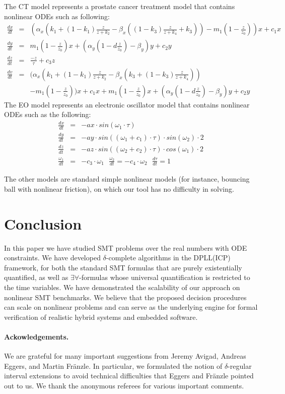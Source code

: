 \documentclass[11pt]{article}
\begin{document}
The CT model represents a prostate cancer treatment model that contains nonlinear ODEs such as following:
\begin{eqnarray*}
\frac{dx}{dt} &=& (\alpha_x
(k_1+(1-k_1)\frac{z}{z+k_2}-\beta_x( (1-k_3)\frac{z}{z+k_4}+k_3)) - m_1(1-\frac{z}{z_0}))x + c_1 x\\
\frac{dy}{dt} &=& m_1(1-\frac{z}{z_0})x+(\alpha_y (1- d\frac{z}{z_0}) - \beta_y)y+c_2y\\
\frac{dz}{dt} &=& \frac{-z}{\tau} + c_3z\\
\frac{dv}{dt} &=& (\alpha_x
(k_1+(1-k_1)\frac{z}{z+k_2}-\beta_x(k_3+(1-k_3)\frac{z}{z+k_4}))\\
& &- m_1(1-\frac{z}{z_0}))x + c_1 x + m_1(1-\frac{z}{z_0})x+(\alpha_y (1- d\frac{z}{z_0}) - \beta_y)y+c_2y
\end{eqnarray*}
The EO model represents an electronic oscillator model that contains nonlinear ODEs such as the following:
\begin{eqnarray*}
\frac{dx}{dt} &=& - ax \cdot sin(\omega_1 \cdot \tau)\\
\frac{dy}{dt} &=& - ay \cdot sin( (\omega_1 + c_1) \cdot \tau) \cdot sin(\omega_2)\cdot 2\\
\frac{dz}{dt} &=& - az \cdot sin( (\omega_2 + c_2) \cdot \tau) \cdot cos(\omega_1)\cdot 2\\
\frac{\omega_1}{dt} &=& - c_3\cdot \omega_1\ \ \ \frac{\omega_2}{dt} = -c_4\cdot\omega_2\ \ \ \frac{d\tau}{dt} = 1
\end{eqnarray*}

The other models are standard simple nonlinear models (for instance, bouncing ball with nonlinear friction), on which our tool has no difficulty in solving.  

\section{Conclusion}\label{conclude}

In this paper we have studied SMT problems over the real numbers with ODE constraints. We have developed $\delta$-complete algorithms in the DPLL(ICP) framework, for both the standard SMT formulas that are purely existentially quantified, as well as $\exists\forall$-formulas whose universal quantification is restricted to the time variables. We have demonstrated the scalability of our approach on nonlinear SMT benchmarks. We believe that the proposed decision procedures can scale on nonlinear problems and can serve as the underlying engine for formal verification of realistic hybrid systems and embedded software.

\paragraph{Ackowledgements.} We are grateful for many important suggestions from Jeremy Avigad, Andreas Eggers, and Martin Fr\"anzle. In particular,  we formulated the notion of $\delta$-regular interval extensions to avoid technical difficulties that Eggers and Fr\"anzle pointed out to us. We thank the anonymous referees for various important comments. 

\end{document}
